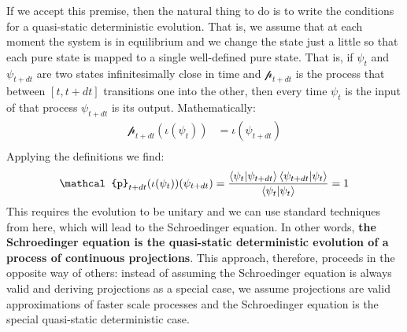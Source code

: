 \documentclass[11pt]{article}
\begin{document}
If we accept this premise, then the natural thing to do is to write the conditions for a quasi-static deterministic evolution. That is, we assume that at each moment the system is in equilibrium and we change the state just a little so that each pure state is mapped to a single well-defined pure state. That is, if $\psi_{t}$ and $\psi_{t+dt}$ are two states infinitesimally close in time and $\mathcal{p}_{t+dt}$ is the process that between $[t, t+dt]$ transitions one into the other, then every time $\psi_{t}$ is the input of that process $\psi_{t+dt}$ is its output. Mathematically:
\begin{equation}
\begin{aligned}
\mathcal{p}_{t+dt}(\iota(\psi_{t}))&=\iota(\psi_{t+dt}) \\
\end{aligned}
\end{equation}
Applying the definitions we find:
\begin{equation}
\begin{aligned}
\mathcal{p}_{t+dt}(\iota(\psi_{t}))(\psi_{t+dt}) &=
\frac{\braket{\psi_{t} | \psi_{t+dt}} \braket{\psi_{t+dt}|\psi_{t}}}{\braket{\psi_{t}|\psi_{t}}} = 1 \\
\end{aligned}
\end{equation}
This requires the evolution to be unitary and we can use standard techniques from here, which will lead to the Schroedinger equation. In other words, \textbf{the Schroedinger equation is the quasi-static deterministic evolution of a process of continuous projections}. This approach, therefore, proceeds in the opposite way of others: instead of assuming the Schroedinger equation is always valid and deriving projections as a special case, we assume projections are valid approximations of faster scale processes and the Schroedinger equation is the special quasi-static deterministic case.
\end{document}
